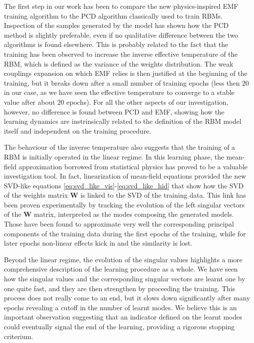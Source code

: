 \documentclass[notitlepage]{revtex4-1}
\begin{document}
The first step in our work has been to compare the new physics-inspired EMF training algorithm to the PCD algorithm classically used to train RBMs. Inspection of the samples generated by the model has shown how the PCD method is slightly preferable, even if no qualitative difference between the two algorithms is found elsewhere. This is probably related to the fact that the training has been observed to increase the inverse effective temperature of the RBM, which is defined as the variance of the weights distribution. The weak couplings expansion on which EMF relies is then justified at the beginning of the training, but it breaks down after a small number of training epochs (less then \(20\) in our case, as we have seen the effective temperature to converge to a stable value after about \(20\) epochs). For all the other aspects of our investigation, however, no difference is found between PCD and EMF, showing how the learning dynamics are instrinsically related to the definition of the RBM model itself and independent on the training procedure.

The behaviour of the inverse temperature also suggests that the training of a RBM is initially operated in the linear regime. In this learning phase, the mean-field approximation borrowed from statistical physics has proved to be a valuable investigation tool. In fact, linearization of mean-field equations provided the new SVD-like equations \eqref{eq:svd_like_vis}-\eqref{eq:svd_like_hid} that show how the SVD of the weights matrix \(\mathbf{W}\) is linked to the SVD of the training data. This link has been proven experimentally by tracking the evolution of the left singular vectors of the \(\mathbf{W}\) matrix, interpreted as the modes composing the generated models. Those have been found to approximate very well the corresponding principal components of the training data during the first epochs of the training, while for later epochs non-linear effects kick in and the similarity is lost.

Beyond the linear regime, the evolution of the singular values highlights a more comprehensive description of the learning procedure as a whole. We have seen how the singular values and the corresponding singular vectors are learnt one by one quite fast, and they are then strengthen by proceeding the training. This process does not really come to an end, but it slows down significantly after many epochs revealing a cutoff in the number of learnt modes. We believe this is an important observation suggesting that an indicator defined on the learnt modes could eventually signal the end of the learning, providing a rigorous stopping criterium.
\end{document}
